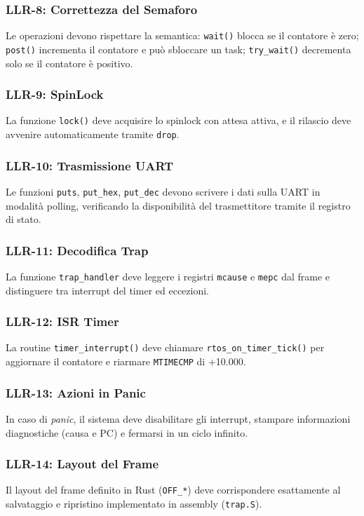 \documentclass[italian, Lau, oneside]{sapthesis} %
\begin{document}
\subsubsection*{LLR-8: Correttezza del Semaforo}
Le operazioni devono rispettare la semantica: \texttt{wait()} blocca se il contatore è zero; \texttt{post()} incrementa il contatore e può sbloccare un task; \texttt{try\_wait()} decrementa solo se il contatore è positivo.  

\subsubsection*{LLR-9: SpinLock}
La funzione \texttt{lock()} deve acquisire lo spinlock con attesa attiva, e il rilascio deve avvenire automaticamente tramite \texttt{drop}.  

\subsubsection*{LLR-10: Trasmissione UART}
Le funzioni \texttt{puts}, \texttt{put\_hex}, \texttt{put\_dec} devono scrivere i dati sulla UART in modalità polling, verificando la disponibilità del trasmettitore tramite il registro di stato.  

\subsubsection*{LLR-11: Decodifica Trap}
La funzione \texttt{trap\_handler} deve leggere i registri \texttt{mcause} e \texttt{mepc} dal frame e distinguere tra interrupt del timer ed eccezioni.  

\subsubsection*{LLR-12: ISR Timer}
La routine \texttt{timer\_interrupt()} deve chiamare \texttt{rtos\_on\_timer\_tick()} per aggiornare il contatore e riarmare \texttt{MTIMECMP} di +10.000.  

\subsubsection*{LLR-13: Azioni in Panic}
In caso di \emph{panic}, il sistema deve disabilitare gli interrupt, stampare informazioni diagnostiche (causa e PC) e fermarsi in un ciclo infinito.  

\subsubsection*{LLR-14: Layout del Frame}
Il layout del frame definito in Rust (\texttt{OFF\_*}) deve corrispondere esattamente al salvataggio e ripristino implementato in assembly (\texttt{trap.S}).  
\end{document}
